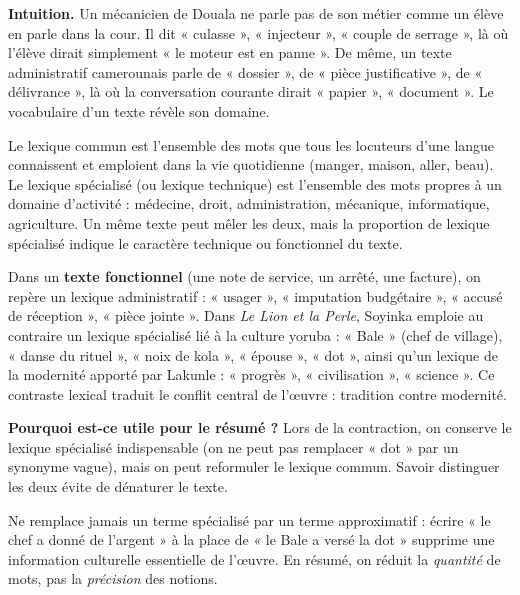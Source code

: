 \documentclass[11pt]{article}
\newcommand{\cle}[1]{{\popxbold\color{popdark}#1}}
\newcounter{popsec}
\newcounter{popsub}
\newcommand{\courssub}[1]{%
  \stepcounter{popsub}%
  \par\vspace{9pt}\noindent{\popxbold\fontsize{11.5}{13}\selectfont\color{popink}{\color{poporange}\thepopsec.\thepopsub}\hspace{6pt}#1}\par\nopagebreak\vspace{4pt}
}
\begin{document}
\courssub{Lexique commun et lexique spécialisé}

\textbf{Intuition.} Un mécanicien de Douala ne parle pas de son métier comme un élève en parle dans la cour. Il dit « culasse », « injecteur », « couple de serrage », là où l'élève dirait simplement « le moteur est en panne ». De même, un texte administratif camerounais parle de « dossier », de « pièce justificative », de « délivrance », là où la conversation courante dirait « papier », « document ». Le vocabulaire d'un texte révèle son domaine.

\begin{definition}
Le \cle{lexique commun} est l'ensemble des mots que tous les locuteurs d'une langue connaissent et emploient dans la vie quotidienne (manger, maison, aller, beau). Le \cle{lexique spécialisé} (ou lexique technique) est l'ensemble des mots propres à un domaine d'activité : médecine, droit, administration, mécanique, informatique, agriculture. Un même texte peut mêler les deux, mais la proportion de lexique spécialisé indique le caractère technique ou fonctionnel du texte.
\end{definition}

\begin{exemplebox}
Dans un \textbf{texte fonctionnel} (une note de service, un arrêté, une facture), on repère un lexique administratif : « usager », « imputation budgétaire », « accusé de réception », « pièce jointe ». Dans \emph{Le Lion et la Perle}, Soyinka emploie au contraire un lexique spécialisé lié à la culture yoruba : « Bale » (chef de village), « danse du rituel », « noix de kola », « épouse », « dot », ainsi qu'un lexique de la modernité apporté par Lakunle : « progrès », « civilisation », « science ». Ce contraste lexical traduit le conflit central de l'œuvre : tradition contre modernité.
\end{exemplebox}

\textbf{Pourquoi est-ce utile pour le résumé ?} Lors de la contraction, on conserve le lexique spécialisé indispensable (on ne peut pas remplacer « dot » par un synonyme vague), mais on peut reformuler le lexique commun. Savoir distinguer les deux évite de dénaturer le texte.

\begin{attention}
Ne remplace jamais un terme spécialisé par un terme approximatif : écrire « le chef a donné de l'argent » à la place de « le Bale a versé la dot » supprime une information culturelle essentielle de l'œuvre. En résumé, on réduit la \emph{quantité} de mots, pas la \emph{précision} des notions.
\end{attention}
\end{document}
